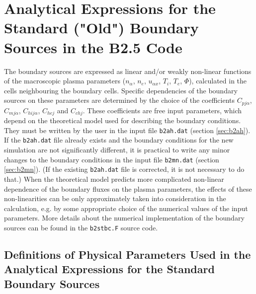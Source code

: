\documentclass[a4paper,10pt]{report}
\begin{document}
\section{Analytical Expressions for the Standard ("Old") Boundary Sources
in the B2.5 Code}

The boundary sources are expressed as linear and/or weakly non-linear
functions of the macroscopic plasma parameters ($n_{\alpha}$, $n_{e}$,
$u_{\alpha x}$, $T_{i}$, $T_{e}$, $\Phi$), calculated in
the cells neighbouring the boundary cells. Specific dependencies of the
boundary sources on these parameters are determined by the choice of the
coefficients $C_{pj\alpha}$, $C_{mj\alpha}$, $C_{hij\alpha}$, $C_{hej}$ and
$C_{chj}$. These coefficients are free input parameters,
which depend on the theoretical model used for describing the boundary
conditions. They must be written by the user in the input file
{\tt b2ah.dat} (section \ref{sec:b2ah}). If the {\tt b2ah.dat} file already exists and the boundary
conditions for the new simulation are not significantly different, it is
practical to write any minor changes to the boundary conditions in the input
file {\tt b2mn.dat} (section \ref{sec:b2mn}). (If the existing {\tt b2ah.dat} file is
corrected, it is not necessary to do that.) When the theoretical model
predicts more complicated non-linear dependence of the boundary fluxes on
the plasma parameters, the effects of these non-linearities can be only
approximately taken into consideration in the calculation, e.g. by some
appropriate choice of the numerical values of the input parameters. More
details about the numerical implementation of
the boundary sources can be found in the {\tt b2stbc.F} source code.

\subsection{Definitions of Physical Parameters Used in the Analytical
Expressions for the Standard Boundary Sources}
\end{document}
